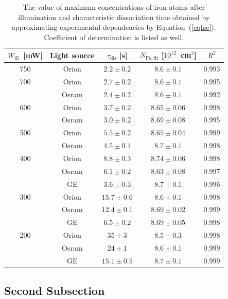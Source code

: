\documentclass{WileyMSP-template}
\begin{document}
\begin{table}
 \caption{The value of maximum concentrations of iron atoms after illumination and
characteristic dissociation time obtained by approximating experimental dependencies by Equation~(\ref{eqIsc}).
Coefficient of determination is listed as well.}
 \label{tb1}
  \begin{tabular}[htbp]{@{}ccccc@{}}
    \hline
    $W_\mathrm{ill}$~[mW] & Light source & $\tau_\mathrm{dis}$ [s] & $N_\mathrm{Fe,fit}$ [$10^{12}$~cm$^2$] & $R^2$ \\
    \hline
    750  & Orion  & $2.2\pm0.2$ & $8.6\pm0.1$ & 0.993 \\
    700  & Orion  & $2.7\pm0.2$ & $8.6\pm0.1$ & 0.995 \\
         & Osram  & $2.4\pm0.2$ & $8.6\pm0.1$ & 0.992 \\
    600  & Orion  & $3.7\pm0.2$ & $8.65\pm0.06$ & 0.998 \\
         & Osram  & $3.0\pm0.2$ & $8.69\pm0.08$ & 0.995 \\
    500  & Orion  & $5.5\pm0.2$ & $8.65\pm0.04$ & 0.999 \\
         & Osram  & $4.5\pm0.1$ & $8.7\pm0.1$ & 0.998 \\
    400  & Orion  & $8.8\pm0.3$ & $8.74\pm0.06$ & 0.998 \\
         & Osram  & $6.1\pm0.2$ & $8.63\pm0.08$ & 0.997 \\
         & GE  & $3.6\pm0.3$ & $8.7\pm0.1$ & 0.996 \\
    300  & Orion  & $15.7\pm0.6$ & $8.6\pm0.1$ & 0.998 \\
         & Osram  & $12.4\pm0.1$ & $8.69\pm0.02$ & 0.999 \\
         & GE  & $6.5\pm0.2$ & $8.69\pm0.05$ & 0.998 \\
    200  & Orion  & $35\pm3$ & $8.5\pm0.3$ & 0.998 \\
         & Osram  & $24\pm1$ & $8.6\pm0.1$ & 0.999 \\
         & GE  & $15.1\pm0.5$ & $8.7\pm0.1$ & 0.999 \\
    \hline
  \end{tabular}
\end{table}

\subsection{Second Subsection}
\end{document}
